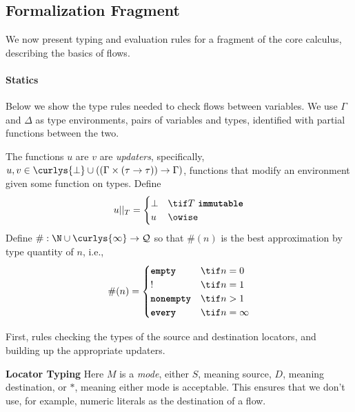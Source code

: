 \documentclass[dvipsnames,runningheads]{llncs}
\begin{document}
\subsection{Formalization Fragment}

We now present typing and evaluation rules for a fragment of the core calculus, describing the basics of flows.

\paragraph{Statics}
Below we show the type rules needed to check flows between variables.
We use $\Gamma$ and $\Delta$ as type environments, pairs of variables and types, identified with partial functions between the two.

The functions $u$ are $v$ are \emph{updaters}, specifically, $u,v \in \curlys{\bot} \cup ((\Gamma \times (\tau \to \tau)) \to \Gamma)$, functions that modify an environment given some function on types.
Define
\[
    u ||_T =
    \begin{cases}
        \bot & \tif T~\immutable \\
        u & \owise
    \end{cases}
\]
Define $\# : \N \cup \curlys{\infty} \to \mathcal{Q}$ so that $\#(n)$ is the best approximation by type quantity of $n$, i.e.,
\[
    \#(n) =
    \begin{cases}
        \emptyq & \tif n = 0 \\
        \exactlyone & \tif n = 1 \\
        \nonempty & \tif n > 1 \\
        \every & \tif n = \infty \\
    \end{cases}
\]

First, rules checking the types of the source and destination locators, and building up the appropriate updaters.

 \textbf{Locator Typing}
Here $M$ is a \emph{mode}, either $S$, meaning source, $D$, meaning destination, or $*$, meaning either mode is acceptable.
This ensures that we don't use, for example, numeric literals as the destination of a flow.

\begin{mathpar}


\end{mathpar}
\end{document}
